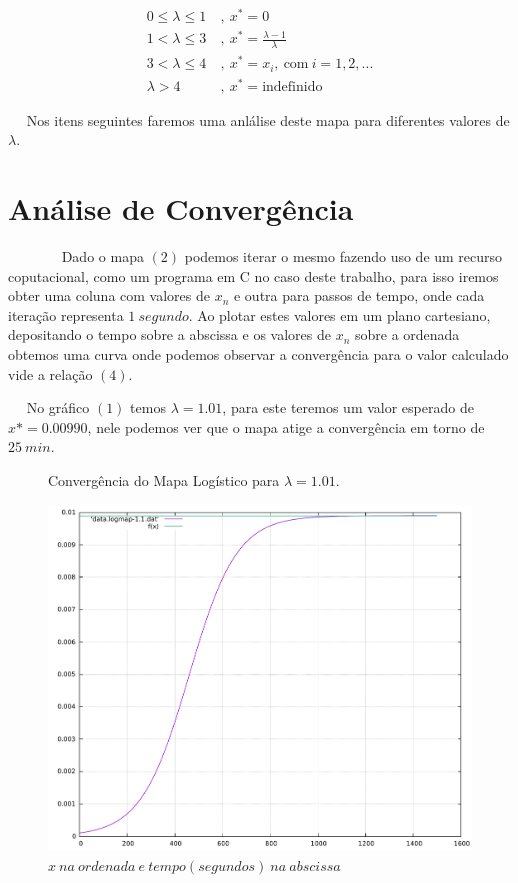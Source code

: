 \documentclass[pdftex,12pt,a4paper]{article}
\begin{document}
\begin{align}
0\leq \lambda \leq 1&\ ,\ x^* = 0\label{eq:0-1}\\
1< \lambda \leq 3&\ ,\ x^* = \frac{\lambda-1}{\lambda}\label{eq:1-3}\\
3< \lambda \leq 4&\ ,\ x^* = x_i,\ \text{com}\ i=1,2,...\label{eq:3-4}\\
\lambda>4&\ ,\ x^*=\text{indefinido}\label{eq:4-inf}
\end{align}

~~ Nos itens seguintes faremos uma anlálise deste mapa para diferentes valores de $\lambda$.
\section{Análise de Convergência}
~~~~~~~ Dado o mapa $(2)$ podemos iterar o mesmo fazendo uso de um recurso coputacional, como um programa em C no caso deste trabalho, para isso iremos obter uma coluna com valores de $x_{n}$ e outra para passos de tempo, onde cada iteração representa $1\ segundo $. Ao plotar estes valores em um plano cartesiano, depositando o tempo sobre a abscissa e os valores de $x_{n}$ sobre a ordenada obtemos uma curva onde podemos observar a convergência para o valor calculado vide a relação $(4)$.\

~~ No gráfico $(1)$ temos $\lambda = 1.01$, para este teremos um valor esperado de $x* = 0.00990$, nele podemos ver que o mapa atige a convergência em torno de $25\ min$. 
\pagebreak
\newpage

\begin{figure}
\centering
\caption{Convergência do Mapa Logístico para $\lambda = 1.01$.}
\includegraphics[scale=0.5]{01}
\caption*{$x\ na\ ordenada\ e\ tempo(segundos)\ na\ abscissa$}
\end{figure}
\end{document}
